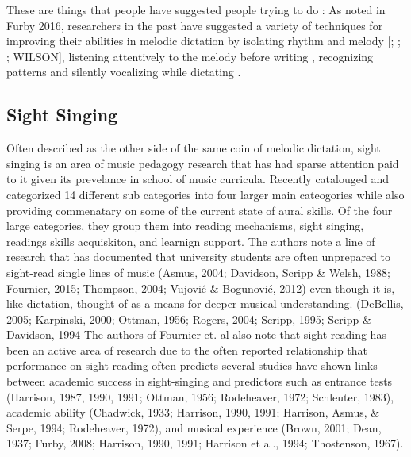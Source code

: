\documentclass[]{book}
\theoremstyle{definition}
\theoremstyle{definition}
\theoremstyle{definition}
\theoremstyle{remark}
\begin{document}
These are things that people have suggested people trying to do : As
noted in Furby 2016, researchers in the past have suggested a variety of
techniques for improving their abilities in melodic dictation by
isolating rhythm and melody {[}\citet{bantonRoleVisualAuditory1995};
\citet{blandSightSingingMelodic1984};
\citet{rootMethodicalSightSingingLessons1931}; WILSON{]}, listening
attentively to the melody before writing
\citep{bantonRoleVisualAuditory1995}, recognizing patterns
\citep{bantonRoleVisualAuditory1995, blandSightSingingMelodic1984, rootMethodicalSightSingingLessons1931}
and silently vocalizing while dictating
\citep{klonoskiImprovingDictationAuralSkills2006}.

\hypertarget{sight-singing}{%
\subsection{Sight Singing}\label{sight-singing}}

Often described as the other side of the same coin of melodic dictation,
sight singing is an area of music pedagogy research that has had sparse
attention paid to it given its prevelance in school of music curricula.
Recently \citep{fournierCognitiveStrategiesSightsinging2017a} catalouged
and categorized 14 different sub categories into four larger main
cateogories while also providing commenatary on some of the current
state of aural skills. Of the four large categories, they group them
into reading mechanisms, sight singing, readings skills acquiskiton, and
learnign support. The authors note a line of research that has
documented that university students are often unprepared to sight-read
single lines of music (Asmus, 2004; Davidson, Scripp \& Welsh, 1988;
Fournier, 2015; Thompson, 2004; Vujović \& Bogunović, 2012) even though
it is, like dictation, thought of as a means for deeper musical
understanding. (DeBellis, 2005; Karpinski, 2000; Ottman, 1956; Rogers,
2004; Scripp, 1995; Scripp \& Davidson, 1994 The authors of Fournier et.
al also note that sight-reading has been an active area of research due
to the often reported relationship that performance on sight reading
often predicts several studies have shown links between academic success
in sight-singing and predictors such as entrance tests (Harrison, 1987,
1990, 1991; Ottman, 1956; Rodeheaver, 1972; Schleuter, 1983), academic
ability (Chadwick, 1933; Harrison, 1990, 1991; Harrison, Asmus, \&
Serpe, 1994; Rodeheaver, 1972), and musical experience (Brown, 2001;
Dean, 1937; Furby, 2008; Harrison, 1990, 1991; Harrison et al., 1994;
Thostenson, 1967).
\end{document}
